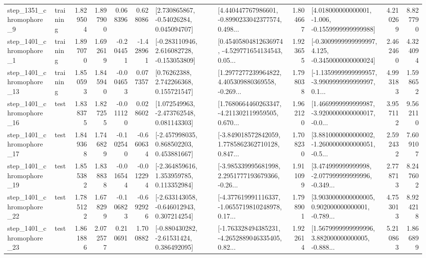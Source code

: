 \begin{tabular}{llrrrrllrlrr}
  step\_1351\_chromophore\_9 &  training &      1.829504 &    1.897900 &      0.068396 &  0.628086 &     [2.730865867, -0.54026284, 0.045094707] &  [4.440447767986601, -0.8990233042377574, 0.498... &       1.804667 &   [4.018000000000001, -1.006, -0.1559999999999988] &            4.210269 &          8.827790 \\
  step\_1401\_chromophore\_1 &  training &      1.897070 &    1.692619 &     -0.204451 & -1.428961 &   [-0.283110946, 2.616082728, -0.153053809] &  [0.45405804812636974, -4.529771654134543, 0.05... &       1.923655 &  [-0.3009999999999997, 4.125, -0.3450000000000024] &            2.462460 &          4.324094 \\
 step\_1401\_chromophore\_13 &  training &      1.850593 &    1.845940 &     -0.004653 &  0.077357 &      [0.76262388, 2.742266368, 0.155721547] &  [1.2977277239964822, 4.405309880369558, -0.269... &       1.798038 &  [-1.1359999999999957, -3.9909999999999997, 0.1... &            4.993183 &          1.598652 \\
 step\_1401\_chromophore\_16 &      test &      1.838375 &    1.827255 &     -0.011120 &  0.028602 &    [1.072549963, -2.473762548, 0.081143303] &  [1.7680664460263347, -4.211302119959505, 0.670... &       1.962120 &  [1.4669999999999987, -3.9200000000000017, -0.0... &            3.957112 &          9.562110 \\
 step\_1401\_chromophore\_17 &      test &      1.849368 &    1.746829 &     -0.102540 & -0.660634 &    [-2.457998035, 0.868502203, 0.453881667] &  [-3.849018572842059, 1.7785862362710128, 0.847... &       1.708230 &  [3.8810000000000002, -1.2600000000000051, -0.5... &            2.592432 &          7.609107 \\
 step\_1401\_chromophore\_19 &      test &      1.855382 &    1.838838 &     -0.016544 & -0.012294 &    [-2.364859616, 1.353959785, 0.113352984] &  [-3.985339995681998, 2.2951777193679366, -0.26... &       1.911099 &  [3.474999999999998, -2.077999999999996, -0.349... &            2.778713 &          8.247602 \\
 step\_1401\_chromophore\_22 &      test &      1.785122 &    1.678299 &     -0.106823 & -0.692926 &   [-2.633143058, -0.646012943, 0.307214254] &  [-4.377619991116337, -1.0655719810248978, 0.17... &       1.798901 &  [3.9030000000000005, 0.902000000000001, -0.789... &            4.753013 &          8.924218 \\
 step\_1401\_chromophore\_23 &      test &      1.861886 &    2.072577 &      0.210691 &  1.700882 &    [-0.880430282, -2.61531424, 0.386492095] &  [-1.763328494385231, -4.2652889046335405, 0.82... &       1.922614 &  [1.5679999999999996, 3.882000000000005, -0.888... &            5.210863 &          1.866899 \\

\end{tabular}
